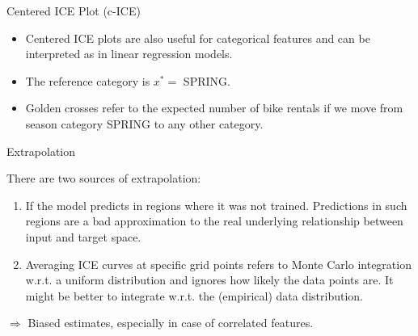 \documentclass[11pt,compress,t,notes=noshow, aspectratio=169, xcolor=table]{beamer}
\begin{document}
\begin{vbframe}{Centered ICE Plot (c-ICE)}
\begin{itemize}
\item Centered ICE plots are also useful for categorical features and can be interpreted as in linear regression models.
\item The reference category is $x^* =$ SPRING.
\item Golden crosses refer to the expected number of bike rentals if we move from season category SPRING to any other category.
\end{itemize}

\end{vbframe}


%
%

\begin{vbframe}{Extrapolation}

There are two sources of extrapolation:
\lz
\begin{enumerate}
  \item If the model predicts in regions where it was not trained. Predictions in such regions are a bad approximation to the real underlying relationship between input and target space.
  \lz
  \item Averaging ICE curves at specific grid points refers to Monte Carlo integration w.r.t. a   uniform distribution and ignores how likely the data points are.
  It might be better to integrate w.r.t. the (empirical) data distribution.
\end{enumerate}
\lz
$\Rightarrow$ Biased estimates, especially in case of correlated features.

\framebreak



\end{vbframe}
\end{document}
